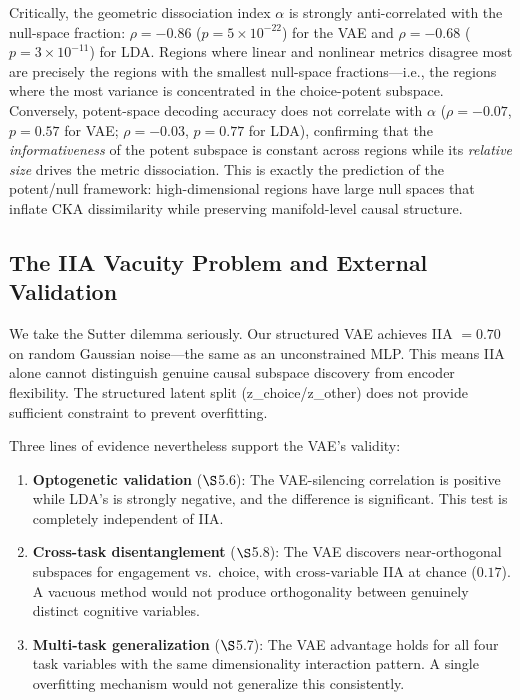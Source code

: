 \documentclass{article}
\begin{document}
Critically, the geometric dissociation index $\alpha$ is strongly anti-correlated with the null-space fraction: $\rho = -0.86$ ($p = 5 \times 10^{-22}$) for the VAE and $\rho = -0.68$ ($p = 3 \times 10^{-11}$) for LDA. Regions where linear and nonlinear metrics disagree most are precisely the regions with the smallest null-space fractions---i.e., the regions where the most variance is concentrated in the choice-potent subspace. Conversely, potent-space decoding accuracy does not correlate with $\alpha$ ($\rho = -0.07$, $p = 0.57$ for VAE; $\rho = -0.03$, $p = 0.77$ for LDA), confirming that the \emph{informativeness} of the potent subspace is constant across regions while its \emph{relative size} drives the metric dissociation. This is exactly the prediction of the potent/null framework: high-dimensional regions have large null spaces that inflate CKA dissimilarity while preserving manifold-level causal structure.

\subsection{The IIA Vacuity Problem and External Validation}

We take the Sutter dilemma seriously. Our structured VAE achieves IIA $= 0.70$ on random Gaussian noise---the same as an unconstrained MLP. This means IIA alone cannot distinguish genuine causal subspace discovery from encoder flexibility. The structured latent split (z\_choice/z\_other) does not provide sufficient constraint to prevent overfitting.

Three lines of evidence nevertheless support the VAE's validity:

\begin{enumerate}
\item \textbf{Optogenetic validation} ($\S$5.6): The VAE-silencing correlation is positive while LDA's is strongly negative, and the difference is significant. This test is completely independent of IIA.
\item \textbf{Cross-task disentanglement} ($\S$5.8): The VAE discovers near-orthogonal subspaces for engagement vs.\ choice, with cross-variable IIA at chance ($0.17$). A vacuous method would not produce orthogonality between genuinely distinct cognitive variables.
\item \textbf{Multi-task generalization} ($\S$5.7): The VAE advantage holds for all four task variables with the same dimensionality interaction pattern. A single overfitting mechanism would not generalize this consistently.
\end{enumerate}
\end{document}
